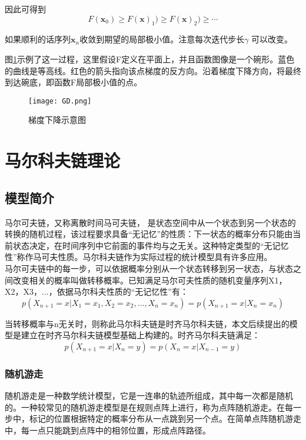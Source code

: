 因此可得到
\[
F(\mathbf{x}_{0})\geq F(\mathbf{x})_{1})\geq F(\mathbf{x})_{2})\geq \cdots
\]

如果顺利的话序列${\textbf{x}_n}$收敛到期望的局部极小值。注意每次迭代步长$\gamma$ 可以改变。

图\ref{GD}示例了这一过程，这里假设F定义在平面上，并且函数图像是一个碗形。蓝色的曲线是等高线。红色的箭头指向该点梯度的反方向。沿着梯度下降方向，将最终到达碗底，即函数F局部极小值的点。
\begin{figure}[h]
	\texttt{[image: GD.png]}
	\caption{梯度下降示意图}
	\label{GD}
\end{figure}


\section{马尔科夫链理论}

\subsection{模型简介}

马尔可夫链，又称离散时间马可夫链，
是状态空间中从一个状态到另一个状态的转换的随机过程，该过程要求具备“无记忆”的性质：下一状态的概率分布只能由当前状态决定，在时间序列中它前面的事件均与之无关。这种特定类型的“无记忆性”称作马可夫性质。马尔科夫链作为实际过程的统计模型具有许多应用。\\
马尔可夫链中的每一步，可以依据概率分别从一个状态转移到另一状态，与状态之间改变相关的概率叫做转移概率。已知满足马尔可夫性质的随机变量序列X1，X2，X3，...，依据马尔科夫性质的“无记忆性”有：
\begin{equation}
\label{markov_nature}
p\left(X_{n+1}=x | X_{1}=x_{1}, X_{2}=x_{2}, \ldots, X_{n}=x_{n}\right)=p\left(X_{n+1}=x | X_{n}=x_{n}\right)
\end{equation}

当转移概率与n无关时，则称此马尔科夫链是时齐马尔科夫链，本文后续提出的模型是建立在时齐马尔科夫链模型基础上构建的。时齐马尔科夫链满足：
\begin{equation}
\label{time_homogeneity}
p\left(X_{n+1}=x | X_{n}=y\right)=p\left(X_{n}=x | X_{n-1}=y\right)
\end{equation}


\subsubsection{随机游走}
随机游走是一种数学统计模型，它是一连串的轨迹所组成，其中每一次都是随机的。一种较常见的随机游走模型是在规则点阵上进行，称为点阵随机游走。在每一步中，标记的位置根据特定的概率分布从一点跳到另一个点。在简单点阵随机游走中，每一点只能跳到点阵中的相邻位置，形成点阵路径。

